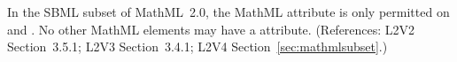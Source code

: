 In the SBML subset of MathML~2.0, the MathML attribute
 is only permitted on 
and .  No other
MathML elements may have a  attribute.  (References:
L2V2 Section~3.5.1; L2V3 Section~3.4.1; 
L2V4 Section~\ref{sec:mathmlsubset}.)
